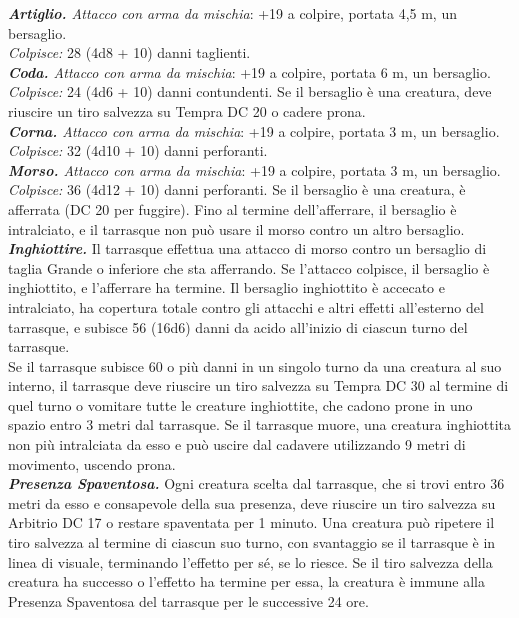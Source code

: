 \begin{multicols}{2}
\emph{\textbf{Artiglio.} Attacco con arma da mischia}: +19 a colpire, portata 4,5 m, un bersaglio.\\
\emph{Colpisce:} 28 (4d8 + 10) danni taglienti. \\
\emph{\textbf{Coda.} Attacco con arma da mischia}: +19 a colpire, portata 6 m, un bersaglio.\\
\emph{Colpisce:} 24 (4d6 + 10) danni contundenti. Se il bersaglio è una creatura, deve riuscire un tiro salvezza su Tempra DC 20 o cadere prona.\\
\emph{\textbf{Corna.} Attacco con arma da mischia}: +19 a colpire, portata 3 m, un bersaglio.\\
\emph{Colpisce:} 32 (4d10 + 10) danni perforanti.\\
\emph{\textbf{Morso.} Attacco con arma da mischia}: +19 a colpire, portata 3 m, un bersaglio.\\
\emph{Colpisce:} 36 (4d12 + 10) danni perforanti. Se il bersaglio è una creatura, è afferrata (DC 20 per fuggire). Fino al termine dell'afferrare, il bersaglio è intralciato, e il tarrasque non può usare il morso contro un altro bersaglio.\\
\emph{\textbf{Inghiottire.}} Il tarrasque effettua una attacco di morso contro un bersaglio di taglia Grande o inferiore che sta afferrando. Se l'attacco colpisce, il bersaglio è inghiottito, e l'afferrare ha termine. Il bersaglio inghiottito è accecato e intralciato, ha copertura totale contro gli attacchi e altri effetti all'esterno del tarrasque, e subisce 56 (16d6) danni da acido all'inizio di ciascun turno del tarrasque.\\
Se il tarrasque subisce 60 o più danni in un singolo turno da una creatura al suo interno, il tarrasque deve riuscire un tiro salvezza su Tempra DC 30 al termine di quel turno o vomitare tutte le creature inghiottite, che cadono prone in uno spazio entro 3 metri dal tarrasque. Se il tarrasque muore, una creatura inghiottita non più intralciata da esso e può uscire dal cadavere utilizzando 9 metri di movimento, uscendo prona.\\
\emph{\textbf{Presenza Spaventosa.}} Ogni creatura scelta dal tarrasque, che si trovi entro 36 metri da esso e consapevole della sua presenza, deve riuscire un tiro salvezza su Arbitrio DC 17 o restare spaventata per 1 minuto. Una creatura può ripetere il tiro salvezza al termine di ciascun suo turno, con svantaggio se il tarrasque è in linea di visuale, terminando l'effetto per sé, se lo riesce. Se il tiro salvezza della creatura ha successo o l'effetto ha termine per essa, la creatura è immune alla Presenza Spaventosa del tarrasque per le successive 24 ore.\\

\end{multicols}

